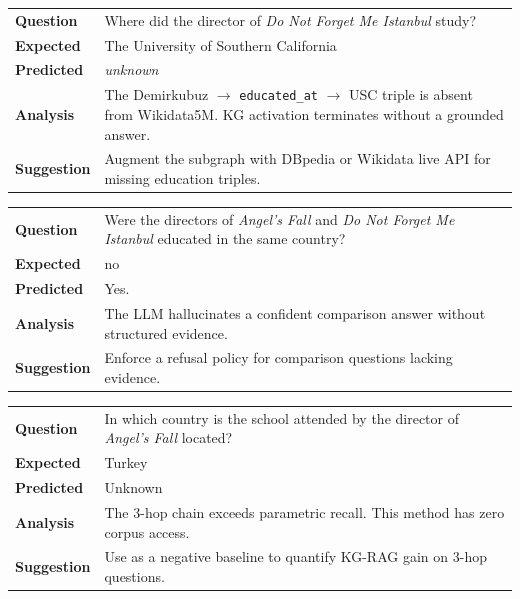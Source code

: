 \documentclass[11pt,a4paper]{article}
\begin{document}
\begin{tcolorbox}[failred,title={Case 1 - KG Data Deficiency | KG-Infused RAG}]
\begin{tabular}{@{}L{2.8cm}L{10.4cm}@{}}
\textbf{Question} & Where did the director of \emph{Do Not Forget Me Istanbul} study? \\[2pt]
\textbf{Expected} & The University of Southern California \\
\textbf{Predicted} & \emph{unknown} \\[4pt]
\textbf{Analysis} & The Demirkubuz $\to$ \texttt{educated\_at} $\to$ USC triple is absent from Wikidata5M. KG activation terminates without a grounded answer. \\[4pt]
\textbf{Suggestion} & Augment the subgraph with DBpedia or Wikidata live API for missing education triples.
\end{tabular}
\end{tcolorbox}

\begin{tcolorbox}[failorange,title={Case 2 - LLM Selection Error | No Retrieval}]
\begin{tabular}{@{}L{2.8cm}L{10.4cm}@{}}
\textbf{Question} & Were the directors of \emph{Angel's Fall} and \emph{Do Not Forget Me Istanbul} educated in the same country? \\[2pt]
\textbf{Expected} & no \\
\textbf{Predicted} & Yes. \\[4pt]
\textbf{Analysis} & The LLM hallucinates a confident comparison answer without structured evidence. \\[4pt]
\textbf{Suggestion} & Enforce a refusal policy for comparison questions lacking evidence.
\end{tabular}
\end{tcolorbox}

\begin{tcolorbox}[failblue,title={Case 3 - Retrieval Error | No Retrieval}]
\begin{tabular}{@{}L{2.8cm}L{10.4cm}@{}}
\textbf{Question} & In which country is the school attended by the director of \emph{Angel's Fall} located? \\[2pt]
\textbf{Expected} & Turkey \\
\textbf{Predicted} & Unknown \\[4pt]
\textbf{Analysis} & The 3-hop chain exceeds parametric recall. This method has zero corpus access. \\[4pt]
\textbf{Suggestion} & Use as a negative baseline to quantify KG-RAG gain on 3-hop questions.
\end{tabular}
\end{tcolorbox}
\end{document}
